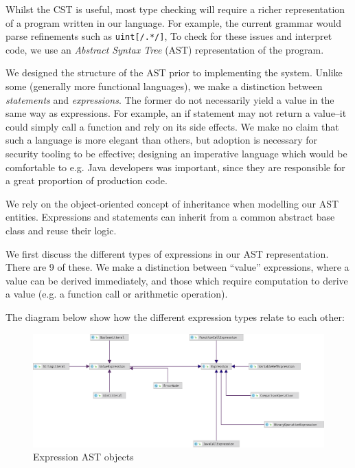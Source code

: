 \documentclass[a4paper,openany,12pt]{book}
\begin{document}
Whilst the CST is useful, most type checking will require a richer representation of a program written in our language.
For example, the current grammar would parse refinements such as \textcolor{id7-ruby-red}{\texttt{uint}}\texttt{[/.*/]},
To check for these issues and interpret code, we use an \emph{Abstract Syntax Tree} (AST) representation of the program.

We designed the structure of the AST prior to implementing the system.
Unlike some (generally more functional languages), we make a distinction between \textit{statements} and
\textit{expressions}.
The former do not necessarily yield a value in the same way as expressions.
For example, an if statement may not return a value--it could simply call a function and rely on its side effects.
We make no claim that such a language is more elegant than others, but adoption is necessary for security tooling
to be effective; designing an imperative language which would be comfortable to e.g. Java developers was important,
since they are responsible for a great proportion of production code.

We rely on the object-oriented concept of inheritance when modelling our AST entities.
Expressions and statements can inherit from a common abstract base class and reuse their logic.

We first discuss the different types of expressions in our AST representation.
There are 9 of these.
We make a distinction between ``value'' expressions, where a value can be derived immediately, and those which require
computation to derive a value (e.g. a function call or arithmetic operation).

The diagram below show how the different expression types relate to each other:

\begin{figure}[H]
    \begin{MyMdframed}
        \vspace{0.5em}

        \caption{\label{figure:ast:expressions}Expression AST objects}
        \vspace{0.5em}
        \captionsetup{style=default}

        \centering \includegraphics[width=0.9\linewidth]{expressions.eps}
    \end{MyMdframed}
\end{figure}
\end{document}
